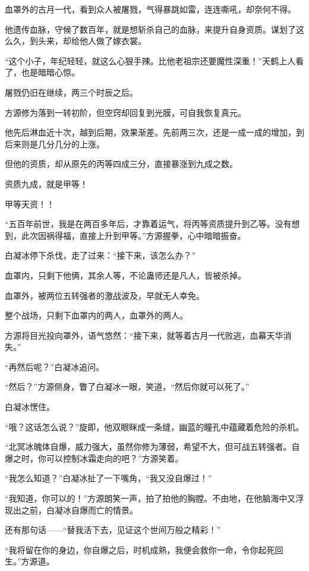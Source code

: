 \begin{this_body}
血罩外的古月一代，看到众人被屠戮，气得暴跳如雷，连连嘶吼，却奈何不得。

他遗传血脉，守候了数百年，就是想斩杀自己的血脉，来提升自身资质。谋划了这么久，到头来，却给他人做了嫁衣裳。

“这个小子，年纪轻轻，就这么心狠手辣。比他老祖宗还要魔性深重！”天鹤上人看了，也是暗暗心惊。

屠戮仍旧在继续，两三个时辰之后。

方源修为落到一转初阶，但空窍却回复到光膜，可自我恢复真元。

他先后淋血近十次，越到后期，效果渐差。先前两三次，还是一成一成的增加，到后来则是几分几分的上涨。

但他的资质，却从原先的丙等四成三分，直接暴涨到九成之数。

资质九成，就是甲等！

甲等天资！！

“五百年前世，我是在两百多年后，才靠着运气，将丙等资质提升到乙等。没有想到，此次因祸得福，直接上升到甲等。”方源握拳，心中暗暗振奋。

白凝冰停下杀伐，走了过来：“接下来，该怎么办？”

血罩内，只剩下他俩，其余人等，不论蛊师还是凡人，皆被杀掉。

血罩外，被两位五转强者的激战波及，早就无人幸免。

整个战场，只剩下血罩内的两人，血罩外的两人。

方源将目光投向罩外，语气悠然：“接下来，就等着古月一代败逃，血幕天华消失。”

“再然后呢？”白凝冰追问。

“然后？”方源侧身，瞥了白凝冰一眼，笑道，“然后你就可以死了。”

白凝冰愣住。

“哦？这话怎么说？”旋即，他双眼眯成一条缝，幽蓝的瞳孔中蕴藏着危险的杀机。

“北冥冰魄体自爆，威力强大，虽然你修为薄弱，希望不大，但可战五转强者。自爆之时，你可以控制冰霜走向的吧？”方源笑着。

“我怎么知道？”白凝冰扯了一下嘴角，“我又没自爆过！”

“我知道，你可以的！”方源朗笑一声，拍了拍他的胸膛。不由地，在他脑海中又浮现出之前，白凝冰自爆而亡的情景。

还有那句话——“替我活下去，见证这个世间万般之精彩！”

“我将留在你的身边，你自爆之后，时机成熟，我便会救你一命，令你起死回生。”方源道。


\end{this_body}
